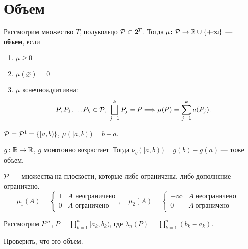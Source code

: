 \dotfill

{\vspace{20pt}  \fontsize{100}{60}\selectfont \faLinux  {}\vspace{20pt}}

\dotfill

\section{Объем}
\begin{defn}[Объем]
    Рассмотрим множество $ T$, полукольцо $ \P \subset 2^{T}$. Тогда $ \mu\colon \P \to \R \cup \{+\infty\}$ --- {\bf объем}, если
\begin{enumerate}[label=(\roman*),noitemsep]
    \item  $ \mu \ge 0$
	\item $ \mu(\varnothing) = 0$

	\item $ \mu$ конечноаддитивна:
		\[
			P, P_1, \ldots P_k \in \P, ~ \bigsqcup_{j=1}^{k}P_j = P \Longrightarrow \mu(P) = \sum_{j=1}^{k} \mu(P_j)
		.\] 
\end{enumerate} 
\end{defn}
\begin{ex}
	$ \P = \P^{1} = \{[a, b)\}$, $ \mu([a, b)) = b - a$.
\end{ex}
\begin{ex}
	$ g\colon \R \to \R$, $ g$ монотонно возрастает. Тогда  $ \nu_{g} ([a, b)) = g(b)-g(a)$ --- тоже объем.
\end{ex}
\begin{ex}
    $ \P$ --- множества на плоскости, которые либо ограничены, либо дополнение ограничено.
	\[
		\mu_1 (A) = 
		\begin{cases}
			1 & A  \text{ неограничено} \\
			0 & A  \text{ ограничено}
		\end{cases}
		, \quad
		\mu_2 (A) = 
		\begin{cases}
			+\infty & A  \text{ неограничено} \\
			0 & A  \text{ ограничено}
		\end{cases}
	\] 
\end{ex}
\begin{ex}
	Рассмотрим $ \P^{n}$, $ P = \prod\limits_{k=1}^{n} [a_k , b_k)$, где $ \lambda _{n}(P) = \prod_{k=1}^{n}(b_k - a_k)$.
	\begin{prac}
	    Проверить, что это объем.
	\end{prac}
\end{ex}

